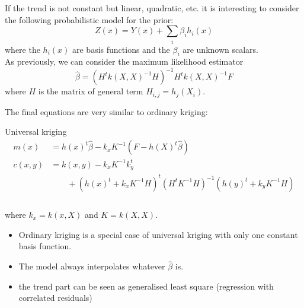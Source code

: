 \documentclass{beamer}
\begin{document}
\begin{frame}{}
If the trend is not constant but linear, quadratic, etc. it is interesting to consider the following probabilistic model for the prior:
\begin{equation*}
	Z(x) = Y(x) + \sum_i \beta_i h_i(x)
\end{equation*}
where the $h_i(x)$ are basis functions and the $\beta_i$ are unknown scalars.\\ \vspace{5mm}
As previously, we can consider the maximum likelihood estimator 
\begin{equation*}
 \hat{\beta} = (H^t k(X,X)^{-1} H)^{-1} H^t k(X,X)^{-1} F 
\end{equation*} 
where $H$ is the matrix of general term $H_{i,j}=h_j(X_i)$.
\end{frame}

\begin{frame}{}
The final equations are very similar to ordinary kriging:
\begin{block}{Universal kriging}
\begin{equation*}
\begin{split}
m(x) &= h(x)^t\hat{\beta} - k_x K^{-1} (F - h(X)^t\hat{\beta}) \\
c(x,y) &=  k(x,y) - k_x K^{-1} k_y^t \\
& \qquad +(h(x)^t + k_xK^{-1}H)^t(H^t K^{-1} H)^{-1}(h(y)^t + k_yK^{-1}H) \\
\end{split}
\end{equation*} 
\\ \vspace{3mm}
where $k_x = k(x,X)$ and $K = k(X,X)$.
\end{block}
\end{frame}

\begin{frame}{}
\begin{itemize}
	\item Ordinary kriging is a special case of universal kriging with only one constant basis function.
	\item The model always interpolates whatever $\hat{\beta}$ is.
	\item the trend part can be seen as generalised least square (regression with correlated residuals)
\end{itemize}
\end{frame}
\end{document}
